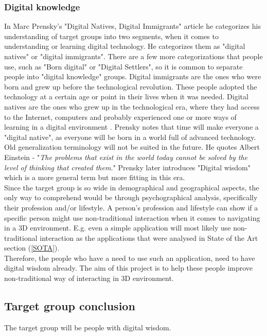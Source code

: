 \subsubsection{Digital knowledge}
In Marc Prensky's "Digital Natives, Digital Immigrants" \cite{DigitalImmigrants} article he categorizes his understanding of target groups into two segments, when it comes to understanding or learning digital technology. He categorizes them as "digital natives" or "digital immigrants". There are a few more categorizations that people use, such as "Born digital" or "Digital Settlers", so it is common to separate people into "digital knowledge" groups.
Digital immigrants are the ones who were born and grew up before the technological revolution. These people adopted the technology at a certain age or point in their lives when it was needed. 
Digital natives are the ones who grew up in the technological era, where they had access to the Internet, computers and probably experienced one or more ways of learning in a digital environment \cite{DigitalImmigrants}. Prensky notes that time will make everyone a "digital native", as everyone will be born in a world full of advanced technology. Old generalization terminology will not be suited in the future. He quotes Albert Einstein - "\textit{The problems that exist in the world today cannot be solved by the level of thinking that created them.}" Prensky later introduces "Digital wisdom" which is a more general term but more fitting in this era\cite{DigitalWisdom}. 
\\
Since the target group is so wide in demographical and geographical aspects, the only way to comprehend would be through psychographical analysis, specifically their profession and/or lifestyle. A person's profession and lifestyle can show if a specific person might use non-traditional interaction when it comes to navigating in a 3D environment. E.g. even a simple application will most likely use non-traditional interaction as the applications that were analysed in State of the Art section (\ref{SOTA}).
\\
Therefore, the people who have a need to use such an application, need to have digital wisdom already. The aim of this project is to help these people improve non-traditional way of interacting in 3D environment.
\\
\subsection{Target group conclusion}
The target group will be people with digital wisdom.